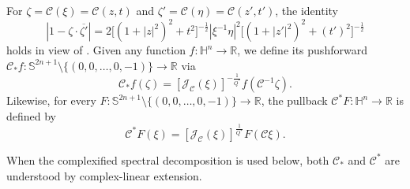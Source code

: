 \documentclass[11pt]{article}
\begin{document}
For $\zeta=\mathcal{C}(\xi)=\mathcal{C}(z,t)$ and $\zeta'=\mathcal{C}(\eta)=\mathcal{C}(z',t')$, the identity
\begin{equation*}
 |1-\zeta\cdot\overline{\zeta'}|=2\big[(1+|z|^2)^2+t^2\big]^{-\frac{1}{2}}|\xi^{-1}\eta|^2\big[(1+|z'|^2)^2+(t')^2\big]^{-\frac{1}{2}}
\end{equation*}
holds in view of \cite[Appendix A]{FL12}.
 Given any function $f:\mathbb{H}^n\rightarrow \mathbb{R}$, we define its pushforward $\mathcal{C}_*f:\mathbb{S}^{2n+1}\setminus \{(0,0,\ldots,0,-1)\}\rightarrow \mathbb{R}$ via
\begin{equation*}
 \mathcal{C}_*f(\zeta)=[\mathcal{J}_\mathcal{C}(\xi)]^{-\frac{1}{Q^{\ast}}}f(\mathcal{C}^{-1}\zeta).
\end{equation*}
Likewise, for every $F:\mathbb{S}^{2n+1}\setminus \{(0,0,\ldots,0,-1)\}\rightarrow \mathbb{R}$, the pullback
$\mathcal{C}^*F:\mathbb{H}^n\rightarrow \mathbb{R}$ is defined by
\begin{equation*}
 \mathcal{C}^*F(\xi)=[\mathcal{J}_\mathcal{C}(\xi)]^{\frac{1}{Q^{\ast}}}F(\mathcal{C}\xi).
\end{equation*}

{When the complexified spectral decomposition is used below, both $\mathcal{C}_*$ and $\mathcal{C}^*$ are understood by complex-linear extension.}
\end{document}
